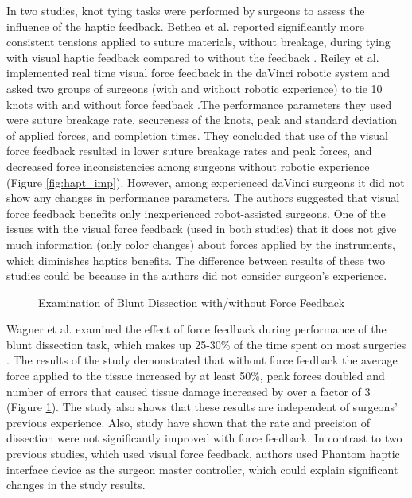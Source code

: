 In two studies, \cite{bethea_application_2004, reiley_effects_2008} knot tying tasks were performed by surgeons to assess the influence of the haptic feedback. Bethea et al. reported significantly more consistent tensions applied to suture materials, without breakage, during tying with visual haptic feedback compared to without the feedback \cite{bethea_application_2004}. Reiley et al. implemented real time visual force feedback in the daVinci robotic system and asked two groups of surgeons (with and without robotic experience) to tie 10 knots with and without force feedback \cite{reiley_effects_2008}
.The performance parameters they used were suture breakage rate, secureness of the knots, peak and standard deviation of applied forces, and completion times. They concluded that use of the visual force feedback resulted in lower suture breakage rates and peak forces, and decreased force inconsistencies among surgeons without robotic experience (Figure \ref{fig:hapt_imp}). However, among experienced daVinci surgeons it did not show any changes in performance parameters. The authors suggested that visual force feedback benefits only inexperienced robot-assisted surgeons. One of the issues with the visual force feedback (used in both studies) that it does not give much information (only color changes) about forces applied by the instruments, which diminishes haptics benefits. The difference between results of these two studies could be because in \cite{bethea_application_2004} the authors did not consider surgeon's experience.


\begin{figure}[h]%
\centering
{}%
\qquad
{}%
\qquad
{}%
\caption[Examination of Blunt Dissection with/without Force Feedback]{Examination of Blunt Dissection with/without Force Feedback \cite{wagner_benefit_2007}}
\label{fig:blant_dissect}%
\end{figure}

Wagner et al. examined the effect of force feedback during performance of the blunt dissection task, which makes up 25-30\% of the time spent on most surgeries  \cite{wagner_benefit_2007}.  The results of the study demonstrated that without force feedback the average force applied to the tissue increased by at least 50\%, peak forces doubled and number of errors that caused tissue damage increased by over a factor of 3 (Figure \ref{fig:blant_dissect}). The study also shows that these results are independent of surgeons' previous experience. Also, study have shown that the rate and precision of dissection were not significantly improved with force feedback. In contrast to two previous studies, which used visual force feedback, authors used Phantom haptic interface device as the surgeon master controller, which could explain significant changes in the study results. 


